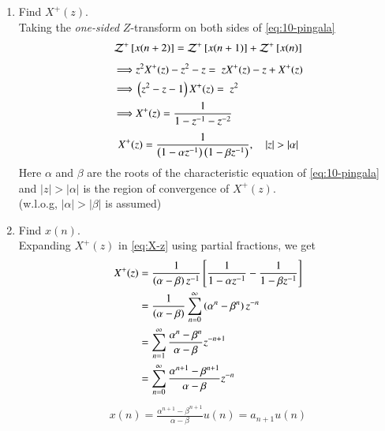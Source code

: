 \documentclass[journal,12pt,twocolumn]{IEEEtran}
\renewcommand\thesection{\arabic{section}}
\begin{document}
\begin{enumerate}[label=\thesection.\arabic*,ref=\thesection.\theenumi]
\newpage


\item Find $X^{+}(z)$. \\
	\solution Taking the {\em one-sided} $Z$-transform on both sides of \eqref{eq:10-pingala}
	\[
		\mathcal{Z}^+{}\left[x(n + 2)\right] = \mathcal{Z}^+{}\left[x(n + 1)\right] + \mathcal{Z}^+{}\left[x(n)\right]
	\]
	\begin{align*}
		\implies &z^2X^+(z) - z^2 - z = \ zX^+(z) - z + X^+(z) \\
		\implies &\left(z^2 - z - 1\right) X^+(z) = \ z^2 \\
		\implies &X^+(z) = \frac{1}{1 - z^{-1} - z^{-2}}
	\end{align*}
	\begin{align}
		X^+(z) = \frac{1}{\left(1 - \alpha z^{-1}\right)\left(1 - \beta z^{-1}\right)}, \quad |z| > |\alpha|
		\label{eq:X-z}
	\end{align}
	Here $\alpha$ and $\beta$ are the roots of the characteristic equation of \eqref{eq:10-pingala} and $|z| > |\alpha|$ is the region of convergence of $X^+(z)$. \\
	(w.l.o.g, $|\alpha| > |\beta|$ is assumed)


\item Find $x(n)$. \\
	\solution Expanding $X^+(z)$ in \eqref{eq:X-z} using partial fractions, we get
	\begin{align*}
		X^+(z) &= \frac{1}{\left(\alpha - \beta\right)z^{-1}}{}\left[\frac{1}{1 - \alpha z^{-1}} - \frac{1}{1 - \beta z^{-1}}\right] \\
			&= \frac{1}{\left(\alpha - \beta\right)}\sum_{n = 0}^{\infty}\left(\alpha^n - \beta^n\right)z^{-n} \\
			&= \sum_{n = 1}^\infty \frac{\alpha^{n} - \beta^{n}}{\alpha - \beta}z^{-n + 1} \\
			&= \sum_{n = 0}^\infty \frac{\alpha^{n + 1} - \beta^{n + 1}}{\alpha - \beta}z^{-n}
	\end{align*}
	\begin{align}
		x(n) = \frac{\alpha^{n + 1} - \beta^{n + 1}}{\alpha - \beta}u(n) = a_{n + 1}u(n)
		\label{eq:x-n-def}
	\end{align}



\end{enumerate}
\end{document}
